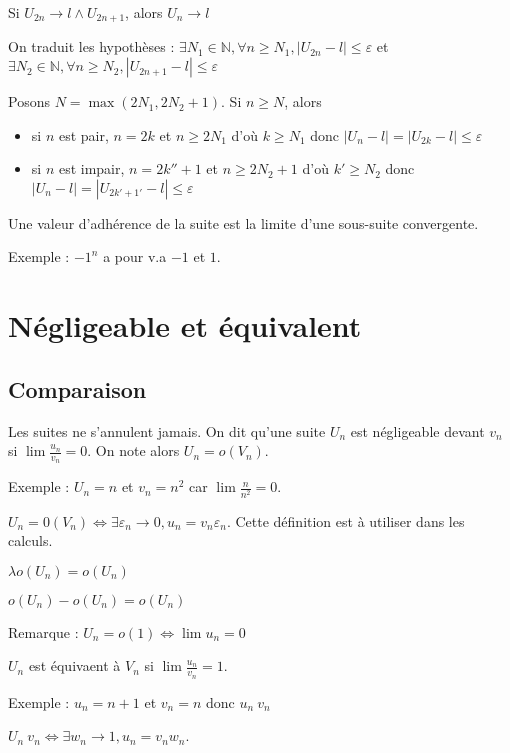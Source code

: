 \documentclass[french]{yLectureNote}
\begin{document}
\begin{theorem}
 Si $U_{2n} \to l \wedge U_{2n+1}$, alors $U_n \to l$
\end{theorem}
\begin{myproof}
On traduit les hypothèses : $\exists N_1\in\mathbb{N}, \forall n\geq N_1, |U_{2n} - l|\leq \varepsilon$ et  $\exists N_2\in\mathbb{N}, \forall n\geq N_2, |U_{2n+1} - l|\leq \varepsilon$

Posons $N = \max(2N_1,2N_2+1)$.
Si $n\geq N$, alors
\begin{itemize}
 \item si $n$ est pair, $n=2k$ et $n\geq 2N_1$ d'où $k\geq N_1$ donc $|U_n-l| = |U_{2k} - l| \leq \varepsilon$
 \item si $n$ est impair, $n=2k''+1$ et $n\geq 2N_2+1$ d'où $k'\geq N_2$ donc $|U_n-l| = |U_{2k'+1'} - l| \leq \varepsilon$
\end{itemize}
\end{myproof}
\begin{theorem}
 Une valeur d'adhérence de la suite est la limite d'une sous-suite convergente.
\end{theorem}
Exemple : $-1^n$ a pour v.a $-1$ et $1$.
\section{Négligeable et équivalent}
\subsection{Comparaison}
Les suites ne s'annulent jamais.
On dit qu'une suite $U_n$ est négligeable devant $v_n$ si $\lim \frac{u_n}{v_n} = 0$. On note alors $U_n = o(V_n)$.

Exemple : $U_n = n$ et $v_n = n^2$ car $\lim \frac{n}{n^2} =0$.
\begin{theorem}
 $U_n = 0(V_n) \iff \exists \varepsilon_n \to 0, u_n = v_n \varepsilon_n$. Cette définition est à utiliser dans les calculs.
\end{theorem}
\begin{theorem}
 $\lambda o(U_n) = o(U_n)$

 $o(U_n) - o(U_n) = o(U_n)$
\end{theorem}
Remarque : $U_n = o(1) \iff \lim u_n = 0$
\begin{theorem}[Équivalent]
 $U_n$ est équivaent à $V_n$ si $\lim \frac{u_n}{v_n} = 1$.
\end{theorem}
Exemple : $u_n = n+1$ et $v_n = n$ donc $u_n~v_n$
\begin{theorem}[Équivalent]
 $U_n~v_n \iff \exists w_n \to 1, u_n = v_nw_n$.
\end{theorem}
\end{document}
